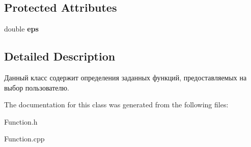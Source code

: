\subsection*{Protected Attributes}
\begin{DoxyCompactItemize}
\item 
\mbox{\label{class_function_a8c8efa0bbf1e627367b7a4bc02b5a5ce}} 
double {\bfseries eps}
\end{DoxyCompactItemize}


\subsection{Detailed Description}
Данный класс содержит определения заданных функций, предоставляемых на выбор пользователю. 

The documentation for this class was generated from the following files\+:\begin{DoxyCompactItemize}
\item 
Function.\+h\item 
Function.\+cpp\end{DoxyCompactItemize}
